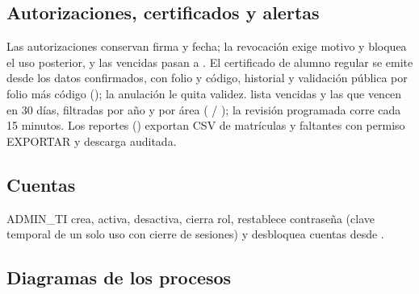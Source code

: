 \subsection{Autorizaciones, certificados y alertas}

Las autorizaciones conservan firma y fecha; la revocación exige motivo y
bloquea el uso posterior, y las vencidas pasan a . El
certificado de alumno regular se emite desde los datos confirmados, con
folio y código, historial y validación pública por folio más código
(); la anulación le quita validez.  lista
vencidas y las que vencen en 30 días, filtradas por año y por área
( / ); la revisión
programada corre cada 15 minutos. Los reportes ()
exportan CSV de matrículas y faltantes con permiso EXPORTAR y descarga
auditada.

\subsection{Cuentas}

ADMIN\_TI crea, activa, desactiva, cierra rol, restablece contraseña (clave
temporal de un solo uso con cierre de sesiones) y desbloquea cuentas desde
.

\clearpage
\subsection{Diagramas de los procesos}


\clearpage
